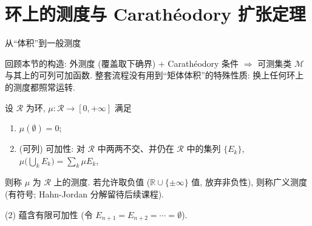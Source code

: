 
\section[测度扩张]{环上的测度与 Carath\'{e}odory 扩张定理}


\begin{frame}{从``体积''到一般测度}

回顾本节的构造: \alert{外测度} (覆盖取下确界) $+$ \alert{Carath\'{e}odory 条件} $\Longrightarrow$ 可测集类 $\mathscr{M}$ 与其上的可列可加函数. 整套流程没有用到``矩体体积''的特殊性质: \alert{换上任何环上的测度都照常运转}.

\pause

\begin{Def}[环上的测度]
设 $\mathscr{R}$ 为环, $\mu: \mathscr{R} \to [0, +\infty]$ 满足
\begin{enumerate}
\item $\mu(\emptyset) = 0$;
\item \alert{(可列) 可加性}: 对 $\mathscr{R}$ 中两两不交、并仍在 $\mathscr{R}$ 中的集列 $\{E_k\}$, $\mu\big(\bigcup_k E_k\big) = \sum_k \mu E_k$,
\end{enumerate}
则称 $\mu$ 为 $\mathscr{R}$ 上的\alert{测度}. 若允许取负值 ($\mathbb{R} \cup \{\pm\infty\}$ 值, 放弃非负性), 则称\alert{广义测度} (有符号; Hahn-Jordan 分解留待后续课程).
\end{Def}

\begin{remark}
(2) 蕴含有限可加性 (令 $E_{n+1} = E_{n+2} = \cdots = \emptyset$).
\end{remark}

\end{frame}


